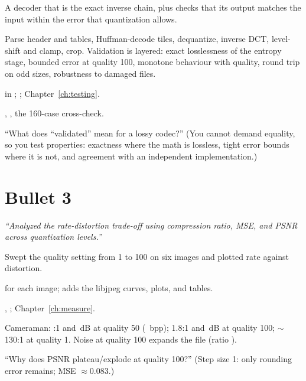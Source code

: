 \begin{description}[leftmargin=2.2cm,style=nextline]
\item[What] A decoder that is the exact inverse chain, plus checks that its output matches the input within the error that quantization allows.
\item[How] Parse header and tables, Huffman-decode tiles, dequantize, inverse DCT, level-shift and clamp, crop. Validation is layered: exact losslessness of the entropy stage, bounded error at quality 100, monotone behaviour with quality, round trip on odd sizes, robustness to damaged files.
\item[Where]  in ; ; Chapter~\ref{ch:testing}.
\item[Evidence] , , the 160-case cross-check.
\item[Expect] ``What does ``validated'' mean for a lossy codec?'' (You cannot demand equality, so you test properties: exactness where the math is lossless, tight error bounds where it is not, and agreement with an independent implementation.)
\end{description}

\section{Bullet 3}
\textit{``Analyzed the rate-distortion trade-off using compression ratio, MSE, and PSNR across quantization levels.''}

\begin{description}[leftmargin=2.2cm,style=nextline]
\item[What] Swept the quality setting from 1 to 100 on six images and plotted rate against distortion.
\item[How]  for each image;  adds the libjpeg curves, plots, and tables.
\item[Where] , ; Chapter~\ref{ch:measure}.
\item[Key numbers] Cameraman: \camQfiftyRatio:1 and \camQfiftyPSNR\,dB at quality 50 (\camQfiftyBpp\ bpp); 1.8:1 and \camQhundredPSNR\,dB at quality 100; $\sim$130:1 at quality 1. Noise at quality 100 expands the file (ratio \noiseQhundredRatio).
\item[Expect] ``Why does PSNR plateau/explode at quality 100?'' (Step size 1: only rounding error remains; MSE $\approx0.083$.)
\end{description}

